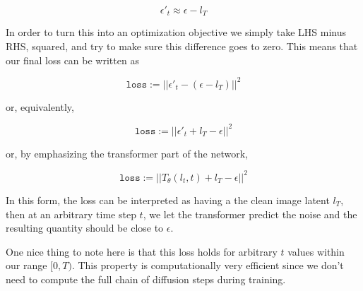 \documentclass{article}
\begin{document}
\[
    \epsilon'_t \approx  \epsilon - l_T
\]

In order to turn this into an optimization objective we simply take LHS minus RHS, squared, and try to make sure this difference goes to zero. This means that our final loss can be written as  


\[
    \boxed{ \texttt{loss} :=  ||\epsilon'_t - (\epsilon - l_T)||^2}
\]

or, equivalently, 

\[
    \boxed{ \texttt{loss} :=  ||\epsilon'_t + l_T - \epsilon||^2}
\]

or, by emphasizing the transformer part of the network, 

\[
    \boxed{ \texttt{loss} :=  ||T_\theta(l_t,t) + l_T - \epsilon||^2}
\]

In this form, the loss can be interpreted as having a the clean image latent $l_T$, then at an arbitrary time step $t$, we let the transformer predict the noise and the resulting quantity should be close to $\epsilon$.


One nice thing to note here is that this loss holds for arbitrary $t$ values within our range $[0, T)$. This property is computationally very efficient since we don't need to compute the full chain of diffusion steps during training.  
\end{document}

